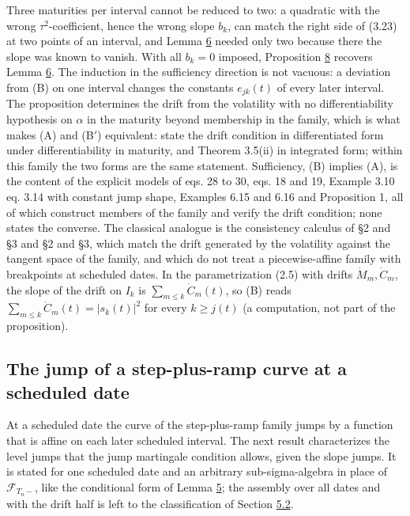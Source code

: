 \documentclass[11pt]{article}
\begin{document}
Three maturities per interval cannot be reduced to two: a quadratic with the wrong \(\tau^2\)-coefficient, hence the wrong slope \(b_k\), can match the right side of (3.23) at two points of an interval, and Lemma \hyperref[res:Lemma-6]{6} needed only two because there the slope was known to vanish. With all \(b_k = 0\) imposed, Proposition \hyperref[res:Proposition-8]{8} recovers Lemma \hyperref[res:Lemma-6]{6}. The induction in the sufficiency direction is not vacuous: a deviation from (B) on one interval changes the constants \(e_{jk}(t)\) of every later interval. The proposition determines the drift from the volatility with no differentiability hypothesis on \(\alpha\) in the maturity beyond membership in the family, which is what makes (A) and (B\('\)) equivalent: \cite{heath1992bond} state the drift condition in differentiated form under differentiability in maturity, and \cite{fontana2022term} Theorem 3.5(ii) in integrated form; within this family the two forms are the same statement. Sufficiency, (B) implies (A), is the content of the explicit models of \cite{gellert2021short} eqs. 28 to 30, \cite{brace2024sofr} eqs. 18 and 19, \cite{fontana2022term} Example 3.10 eq. 3.14 with constant jump shape, \cite{kellerressel2018affine} Examples 6.15 and 6.16 and \cite{kim2014jumps} Proposition 1, all of which construct members of the family and verify the drift condition; none states the converse. The classical analogue is the consistency calculus of \cite{bjork1999interest} §2 and §3 and \cite{filipovic2000exponential} §2 and §3, which match the drift generated by the volatility against the tangent space of the family, and which do not treat a piecewise-affine family with breakpoints at scheduled dates. In the parametrization (2.5) with drifts \(\dot M_m, \dot C_m\), the slope of the drift on \(I_k\) is \(\sum_{m \le k} \dot C_m(t)\), so (B) reads \(\sum_{m \le k} \dot C_m(t) = |s_k(t)|^2\) for every \(k \ge j(t)\) (a computation, not part of the proposition).

\subsection{The jump of a step-plus-ramp curve at a scheduled date}\label{sec:3.6}

At a scheduled date the curve of the step-plus-ramp family jumps by a function that is affine on each later scheduled interval. The next result characterizes the level jumps that the jump martingale condition allows, given the slope jumps. It is stated for one scheduled date and an arbitrary sub-sigma-algebra in place of \(\mathcal F_{T_n-}\), like the conditional form of Lemma \hyperref[res:Lemma-5]{5}; the assembly over all dates and with the drift half is left to the classification of Section \hyperref[sec:5.2]{5.2}.
\end{document}
